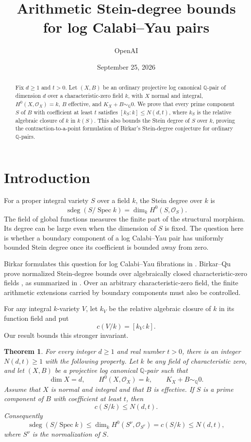 \documentclass[11pt]{article}
\title{Arithmetic Stein-degree bounds\\for log Calabi--Yau pairs}
\author{OpenAI}
\date{September 25, 2026}
\numberwithin{equation}{section}
\newtheorem{theorem}{Theorem}[section]
\theoremstyle{definition}
\newcommand{\Q}{\mathbb Q}
\newcommand{\OO}{\mathcal O}
\newcommand{\Spec}{\operatorname{Spec}}
\newcommand{\sdeg}{\operatorname{sdeg}}
\newcommand{\simq}{\sim_{\Q}}
\newcommand{\cdeg}[2]{c(#1/#2)}
\begin{document}
\maketitle
\vspace{-1.5em}
\begin{abstract}
Fix $d\geq1$ and $t>0$. Let $(X,B)$ be an ordinary projective log canonical
$\Q$-pair of dimension $d$ over a characteristic-zero field $k$, with $X$
normal and integral, $H^0(X,\OO_X)=k$, $B$ effective, and $K_X+B\simq0$.
We prove that every prime component $S$ of $B$ with coefficient at least $t$
satisfies $[k_S:k]\leq N(d,t)$, where $k_S$ is the relative algebraic closure
of $k$ in $k(S)$. This also bounds the Stein degree of $S$ over $k$, proving
the contraction-to-a-point formulation of Birkar's Stein-degree conjecture
for ordinary $\Q$-pairs.
\end{abstract}

\section{Introduction}

For a proper integral variety $S$ over a field $k$, the Stein degree over
$k$ is
\[
 \sdeg(S/\Spec k)=\dim_k H^0(S,\OO_S).
\]
The field of global functions measures the finite part of the structural
morphism. Its degree can be large even when the dimension of $S$ is fixed.
The question here is whether a boundary component of a log Calabi--Yau pair
has uniformly bounded Stein degree once its coefficient is bounded away
from zero.

Birkar formulates this question for log Calabi--Yau fibrations in
\cite[Conjecture~11.1]{Birkar2026}. Birkar--Qu prove normalized
Stein-degree bounds over algebraically closed characteristic-zero fields
\cite[Theorem~1.3]{BirkarQu2025}, as summarized in
\cite[Theorem~12.1]{Birkar2026}. Over an arbitrary characteristic-zero
field, the finite arithmetic extensions carried by boundary components
must also be controlled.

For any integral $k$-variety $V$, let $k_V$ be the relative algebraic closure
of $k$ in its function field and put
\begin{equation}\label{eq:constants}
 \cdeg{V}{k}=[k_V:k].
\end{equation}
Our result bounds this stronger invariant.

\begin{theorem}\label{thm:main}
For every integer $d\geq 1$ and real number $t>0$, there is an integer
$N(d,t)\geq1$ with the following property. Let $k$ be any field of
characteristic zero, and let $(X,B)$ be a projective log canonical
$\Q$-pair such that
\[
 \dim X=d,\qquad H^0(X,\OO_X)=k,\qquad K_X+B\simq0.
\]
Assume that $X$ is normal and integral and that $B$ is effective. If $S$ is
a prime component of $B$ with coefficient at least $t$, then
\[
 \cdeg{S}{k}\leq N(d,t).
\]
Consequently
\[
 \sdeg(S/\Spec k)\leq
 \dim_k H^0(S^\nu,\OO_{S^\nu})
 =\cdeg{S}{k}\leq N(d,t),
\]
where $S^\nu$ is the normalization of $S$.
\end{theorem}
\end{document}
